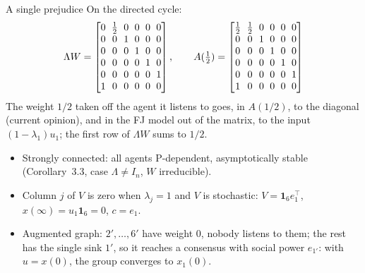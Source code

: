 \begin{frame}[label=bk-one-prej]{A single prejudice}
  \small
  On the directed cycle:
  \[
    {\setlength{\arraycolsep}{3pt}
    \Lambda W = \begin{bmatrix}
       0&\frac12&0&0&0&0\\ 0&0&1&0&0&0\\ 0&0&0&1&0&0\\ 0&0&0&0&1&0\\ 0&0&0&0&0&1\\ 1&0&0&0&0&0
    \end{bmatrix},
    \qquad
    A(\tfrac12) = \begin{bmatrix}
       \frac12&\frac12&0&0&0&0\\ 0&0&1&0&0&0\\ 0&0&0&1&0&0\\ 0&0&0&0&1&0\\ 0&0&0&0&0&1\\ 1&0&0&0&0&0
    \end{bmatrix}}
  \]
  The weight $1/2$ taken off the agent it listens to goes, in $A(1/2)$, to the diagonal
  (current opinion), and in the FJ model out of the matrix, to the input
  $(1 - \lambda_1)u_1$; the first row of $\Lambda W$ sums to $1/2$.
  \begin{itemize}
    \item Strongly connected: all agents P-dependent, asymptotically stable
          (Corollary~3.3, case $\Lambda \neq I_n$, $W$ irreducible).
    \item Column $j$ of $V$ is zero when $\lambda_j = 1$ and $V$ is stochastic:
          $V = \mathbf{1}_6 e_1^\top$, $x(\infty) = u_1\mathbf{1}_6 = 0$, $c = e_1$.
    \item Augmented graph: $2', \dots, 6'$ have weight $0$, nobody listens to them; the
          rest has the single sink $1'$, so it reaches a consensus with social power
          $e_{1'}$: with $u = x(0)$, the group converges to $x_1(0)$.
  \end{itemize}
\end{frame}

